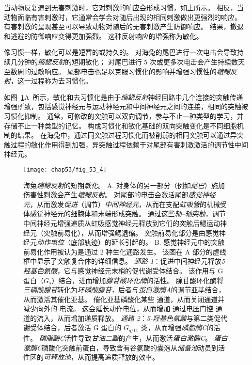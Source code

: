 当动物反复遇到无害刺激时，它对刺激的响应会形成习惯，如上所示。
相反，当动物面临有害刺激时，它通常会学会对随后出现的相同刺激做出更强烈的响应。
有害刺激的呈现甚至可以导致动物对随后的无害刺激产生防御响应。
结果，撤退和逃避的防御响应变得更加强烈。
这种反射响应的增强称为敏化。



像习惯一样，敏化可以是短暂的或持久的。
对海兔的尾巴进行一次电击会导致持续几分钟的\textit{缩鳃反射}的短期敏化；
对尾巴进行 5 次或更多次电击会产生持续数天至数周的过敏响应。
尾部电击也足以克服习惯化的影响并增强习惯性的\textit{缩鳃反射}，这一过程称为去习惯化。


如图~\ref{fig:53_4}A~所示，敏化和去习惯化是由于\textit{缩鳃反射}神经回路中几个连接的突触传递增强所致，包括感觉神经元与运动神经元和中间神经元之间的连接，相同的突触被习惯化抑制。
通常，可修改的突触可以双向调节，参与不止一种类型的学习，并存储不止一种类型的记忆。
构成习惯化和敏化基础的双向突触变化是不同细胞机制的结果。
在海兔中，通过同突触过程习惯化而被削弱的相同突触可以通过异突触过程的敏化作用得到加强，异突触过程依赖于对尾部有害刺激激活的调节性中间神经元。


\begin{figure}[htbp]
	\centering
	\texttt{[image: chap53/fig\_53\_4]}
	\caption{海兔\textit{缩鳃反射}的短期\textit{敏化}。
		A. 对身体的另一部分（例如\textit{尾巴}）施加伤害性刺激会产生\textit{缩鳃反射}。
		对尾部的电击会激活尾部\textit{感觉神经元}，从而激发\textit{促进}（调节）\textit{中间神经元}，从而在支配\textit{虹吸管}的机械受体感觉神经元的细胞体和末端形成突触。
		通过这些\textit{轴–轴突触}，调节中间神经元增强递质从虹吸感觉神经元释放到它们的突触后鳃运动神经元（突触前易化），从而增强鳃退缩。
		突触前易化部分是由感觉神经元\textit{动作电位}（底部轨迹）的延长引起的\cite{pinsker1970habituation,klein1980mechanism}。
		B. 感觉神经元中的突触前易化作用被认为是通过 2 种生化通路发生。
		该图在 A 部分的虚线框中显示了突触复合体的详细信息。
		\textit{通路 1}：促进中间神经元释放\textit{5-羟基色氨酸}，它与感觉神经元末梢的促代谢受体结合。
		该作用与 G 蛋白（$ G_s $）结合，进而增加\textit{腺苷酸环化酶}的活性。
		腺苷酸环化酶将\textit{三磷酸腺苷}转化为\textit{环磷酸腺苷}，后者与\textit{蛋白激酶A}的调节亚基结合，从而激活其催化亚基。
		催化亚基磷酸化某些  通道，从而关闭通道并减少向外的  电流。
		这会延长动作电位，从而增加  通过电压门控  通道的流入，从而增加递质释放。
		\textit{通路 2}：\textit{5-羟基色氨酸}与第二类促代谢受体结合，后者激活 G 蛋白的 $ G_{q/11} $ 类，从而增强\textit{磷脂酶C}的活性。
		\textit{磷脂酶C}活性导致\textit{甘油二酯}的产生，从而激活\textit{蛋白激酶C}。
		\textit{蛋白激酶C}磷酸化突触前蛋白，导致含有谷氨酸的囊泡从\textit{储备池}动员到活性区的\textit{可释放池}，从而提高递质释放的效率。}
	\label{fig:53_4}
\end{figure}


